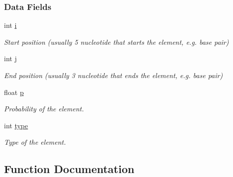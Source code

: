 \subsubsection*{Data Fields}
\begin{DoxyCompactItemize}
\item 
\mbox{\label{group__struct__utils__plist_a0f8bb11ded4e605f816d7ad92eb568f6}} 
int \mbox{\hyperlink{group__struct__utils__plist_a0f8bb11ded4e605f816d7ad92eb568f6}{i}}
\begin{DoxyCompactList}\small\item\em Start position (usually 5\textquotesingle{} nucleotide that starts the element, e.\+g. base pair) \end{DoxyCompactList}\item 
\mbox{\label{group__struct__utils__plist_acada5be62ed6843334a918ca543f0c0d}} 
int \mbox{\hyperlink{group__struct__utils__plist_acada5be62ed6843334a918ca543f0c0d}{j}}
\begin{DoxyCompactList}\small\item\em End position (usually 3\textquotesingle{} nucleotide that ends the element, e.\+g. base pair) \end{DoxyCompactList}\item 
\mbox{\label{group__struct__utils__plist_a9c09385582d8a7ab00485181f4e868b7}} 
float \mbox{\hyperlink{group__struct__utils__plist_a9c09385582d8a7ab00485181f4e868b7}{p}}
\begin{DoxyCompactList}\small\item\em Probability of the element. \end{DoxyCompactList}\item 
\mbox{\label{group__struct__utils__plist_a11715ffa51cb6277db7ebd3d9170d691}} 
int \mbox{\hyperlink{group__struct__utils__plist_a11715ffa51cb6277db7ebd3d9170d691}{type}}
\begin{DoxyCompactList}\small\item\em Type of the element. \end{DoxyCompactList}\end{DoxyCompactItemize}


\subsection{Function Documentation}
\mbox{\label{group__struct__utils__plist_gaf002d69024d709744664a8b9ca3dd77d}} 
